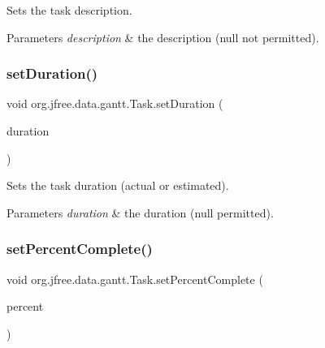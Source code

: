 Sets the task description.


\begin{DoxyParams}{Parameters}
{\em description} & the description ({\ttfamily null} not permitted). \\
\hline
\end{DoxyParams}
\mbox{\label{classorg_1_1jfree_1_1data_1_1gantt_1_1_task_a04281bee83c3e14887c3f79680483068}} 
\subsubsection{\texorpdfstring{set\+Duration()}{setDuration()}}
{\footnotesize\ttfamily void org.\+jfree.\+data.\+gantt.\+Task.\+set\+Duration (\begin{DoxyParamCaption}\item[{\mbox{\hyperlink{interfaceorg_1_1jfree_1_1data_1_1time_1_1_time_period}{Time\+Period}}}]{duration }\end{DoxyParamCaption})}

Sets the task duration (actual or estimated).


\begin{DoxyParams}{Parameters}
{\em duration} & the duration ({\ttfamily null} permitted). \\
\hline
\end{DoxyParams}
\mbox{\label{classorg_1_1jfree_1_1data_1_1gantt_1_1_task_a65d0c00ef5d447498219c70719946394}} 
\subsubsection{\texorpdfstring{set\+Percent\+Complete()}{setPercentComplete()}\hspace{0.1cm}{\footnotesize\ttfamily [1/2]}}
{\footnotesize\ttfamily void org.\+jfree.\+data.\+gantt.\+Task.\+set\+Percent\+Complete (\begin{DoxyParamCaption}\item[{Double}]{percent }\end{DoxyParamCaption})}


